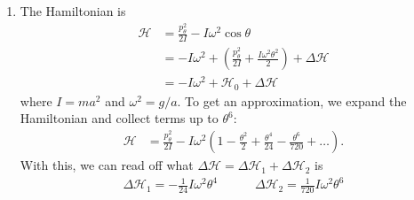 \documentclass{article}
\theoremstyle{definition}
\newcommand{\ham}{\mathcal{H}}
\newcommand{\f}[2]{\frac{#1}{#2}}
\newcommand{\lp}{\left(}
\newcommand{\rp}{\right)}
\begin{document}
\begin{enumerate}[label=(\alph*)]
	\item The Hamiltonian is 
	\begin{align*}
	\ham 
	&= \f{p_\theta^2}{2I} - I\omega^2 \cos\theta \\
	&= -I\omega^2 + \lp \f{p_\theta^2}{2I} + \f{I \omega^2 \theta^2}{2} \rp + \Delta \ham \\
	&= - I \omega^2 + \ham_0 + \Delta \ham 
	\end{align*}
	where $I = ma^2$ and $\omega^2 = g/a$. To get an approximation, we expand the Hamiltonian and collect terms up to $\theta^6$:
	\begin{align*}
	\ham 
	&= \f{p_\theta^2}{2I} - I\omega^2 \lp 1- \f{\theta^2}{2} + \f{\theta^4}{24} - \f{\theta^6}{720} + \dots  \rp.
	\end{align*}
	With this, we can read off what $\Delta \ham = \Delta \ham_1 + \Delta \ham_2$ is 
	\begin{align*}
	\boxed{\Delta \ham_1 = -\f{1}{24} I \omega^2 \theta^4} \quad\quad\quad \boxed{\Delta \ham_2 = \f{1}{720} I \omega^2 \theta^6}
	\end{align*}
	

\end{enumerate}
\end{document}
